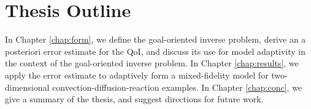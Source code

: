 \section{Thesis Outline}  %

In Chapter \ref{chap:form}, we define the goal-oriented inverse problem, derive an a posteriori error estimate for the QoI, and discuss its use for model adaptivity in the context of the goal-oriented inverse problem. In Chapter \ref{chap:results}, we apply the error estimate to adaptively form a mixed-fidelity model for two-dimensional convection-diffusion-reaction examples. In Chapter \ref{chap:conc}, we give a summary of the thesis, and suggest directions for future work.

